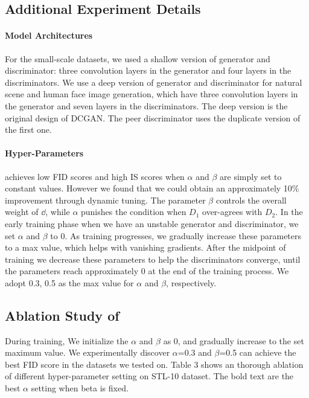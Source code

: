 \subsection{Additional Experiment Details}

\paragraph{Model Architectures}

For the small-scale datasets, we used a shallow version of generator and discriminator: three convolution layers in the generator and four layers in the
discriminators. We use a deep version of generator and discriminator for natural
scene and human face image generation, which have three convolution layers in
the generator and seven layers in the discriminators. The deep version is the
original design of DCGAN\cite{DCGAN}. The peer discriminator uses the duplicate version of the first one.


\paragraph{Hyper-Parameters}\label{app:para} 
 
\PG{} achieves low FID scores and high IS scores when $\alpha$ and $\beta$ are simply set to constant values. However we found that we could obtain an approximately 10\% improvement through dynamic tuning. The parameter $\beta$ controls the overall weight of $\dd$, while $\alpha$ punishes the condition when $D_1$ over-agrees with $D_2$. In the early training phase when we have an unstable generator and discriminator, we set $\alpha$ and $\beta$ to 0. As training progresses, we gradually increase these parameters to a max value, which helps with vanishing gradients. After the midpoint of training we decrease these parameters to help the discriminators converge, until the parameters reach approximately 0 at the end of the training process. We adopt 0.3, 0.5 as the max value for $\alpha$ and $\beta$, respectively.

\subsection{Ablation Study of \PG{}}
During training, We initialize the $\alpha$ and $\beta$ as 0, and gradually increase to the set maximum value. We experimentally discover $\alpha$=0.3 and $\beta$=0.5 can achieve the best FID score in the datasets we tested on. Table 3 shows an thorough ablation of  different hyper-parameter setting on STL-10 dataset. The bold text are the best $\alpha$ setting when beta is fixed. 
 
